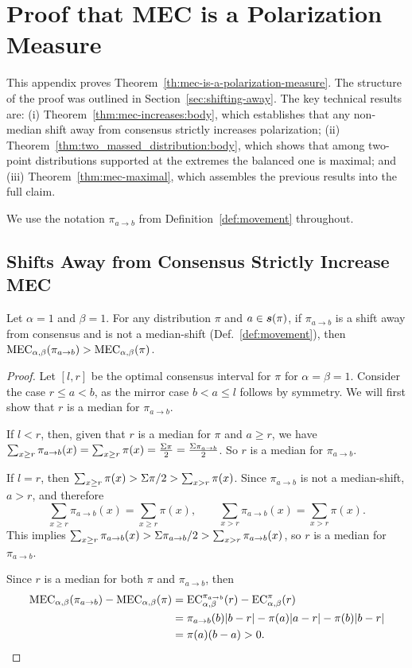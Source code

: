 \section{Proof that MEC is a Polarization Measure}
\label{Appendix:mec-polarization-measure}
\def\sign{{\textrm{sign}}}
\def\half{{\frac{1}{2}}}

This appendix proves Theorem~\ref{th:mec-is-a-polarization-measure}. The structure of the proof was outlined in Section~\ref{sec:shifting-away}. The key technical results are: (i) Theorem~\ref{thm:mec-increases:body}, which establishes that any non-median shift away from consensus strictly increases polarization; (ii) Theorem~\ref{thm:two_massed_distribution:body}, which shows that among two-point distributions supported at the extremes the balanced one is maximal; and (iii) Theorem~\ref{thm:mec-maximal}, which assembles the previous results into the full claim.

We use the notation $\pi_{a\to b}$ from Definition~\ref{def:movement} throughout.

\subsection{Shifts Away from Consensus Strictly Increase MEC}

\begin{theorem}\label{thm:mec-increases-a1-b1}
Let $\alpha = 1$ and $\beta=1$. For any distribution $\pi$ and $a\in\boldsymbol{s}(\pi)$, if $\pi_{a\to b}$ is a shift away from consensus and is not a median-shift (Def.~\ref{def:movement}), then $\MEC(\pi_{a\to b}) > \MEC(\pi)$.
\end{theorem}
\begin{proof}
Let $[l,r]$ be the optimal consensus interval for $\pi$ for $\alpha=\beta=1$. Consider the case $r\le a<b$, as the mirror case $b<a\le l$ follows by symmetry.
We will first show that $r$ is a median for $\pi_{a\to b}$.

If $l<r$, then, given that $r$ is a median for $\pi$ and $a\ge r$, we have $\sum_{x\ge r}\pi_{a\to b}(x)=\sum_{x\ge r}\pi(x)=\frac{\Sigma \pi}{2}=\frac{\Sigma \pi_{a\to b}}{2}$. So $r$ is a median for $\pi_{a\to b}$.

If $l=r$, then $\sum_{x\ge r} \pi(x)> \Sigma \pi/2 > \sum_{x > r} \pi(x)$. Since $\pi_{a\to b}$ is not a median-shift, $a>r$, and therefore
\[
\sum_{x\ge r}\pi_{a\to b}(x)=\sum_{x\ge r} \pi(x),
\qquad
\sum_{x> r}\pi_{a\to b}(x)=\sum_{x> r} \pi(x).
\]
This implies $\sum_{x\ge r} \pi_{a\to b}(x)> \Sigma \pi_{a\to b}/2 > \sum_{x > r} \pi_{a\to b}(x)$, so $r$ is a median for $\pi_{a\to b}$.

Since $r$ is a median for both $\pi$ and $\pi_{a\to b}$, then
\[
\begin{aligned}
\MEC(\pi_{a\to b}) - \MEC(\pi) &= \EC[\alpha,\beta][\pi_{a\to b}](r) - \EC[\alpha,\beta][\pi](r)\\
&=\pi_{a\to b}(b) |b-r| - \pi(a) |a-r| - \pi(b) |b-r|\\
&=\pi(a) (b-a) > 0.
\end{aligned}
\]
\end{proof}

